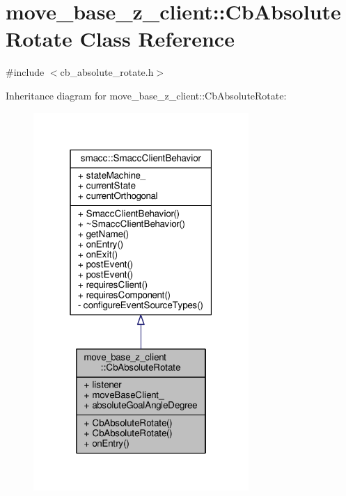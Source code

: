 \hypertarget{classmove__base__z__client_1_1CbAbsoluteRotate}{}\section{move\+\_\+base\+\_\+z\+\_\+client\+:\+:Cb\+Absolute\+Rotate Class Reference}
\label{classmove__base__z__client_1_1CbAbsoluteRotate}


{\ttfamily \#include $<$cb\+\_\+absolute\+\_\+rotate.\+h$>$}



Inheritance diagram for move\+\_\+base\+\_\+z\+\_\+client\+:\+:Cb\+Absolute\+Rotate\+:\nopagebreak
\begin{figure}[H]
\begin{center}
\leavevmode
\includegraphics[width=232pt]{classmove__base__z__client_1_1CbAbsoluteRotate__inherit__graph}
\end{center}
\end{figure}


